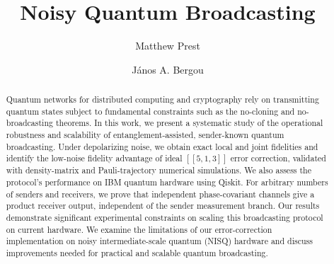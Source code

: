 \documentclass[aps,physrev,10pt,twocolumn,superscriptaddress,floatfix]{revtex4-2}
\begin{document}
\title{Noisy Quantum Broadcasting}

\author{Matthew Prest}

\author{János A. Bergou}

\begin{abstract}
Quantum networks for distributed computing and cryptography rely on transmitting quantum states subject to fundamental constraints such as the no-cloning and no-broadcasting theorems. In this work, we present a systematic study of the operational robustness and scalability of entanglement-assisted, sender-known quantum broadcasting. Under depolarizing noise, we obtain exact local and joint fidelities and identify the low-noise fidelity advantage of ideal $[[5,1,3]]$ error correction, validated with density-matrix and Pauli-trajectory numerical simulations. We also assess the protocol's performance on IBM quantum hardware using Qiskit. For arbitrary numbers of senders and receivers, we prove that independent phase-covariant channels give a product receiver output, independent of the sender measurement branch. Our results demonstrate significant experimental constraints on scaling this broadcasting protocol on current hardware. We examine the limitations of our error-correction implementation on noisy intermediate-scale quantum (NISQ) hardware and discuss improvements needed for practical and scalable quantum broadcasting.
\end{abstract}

\maketitle
\end{document}
